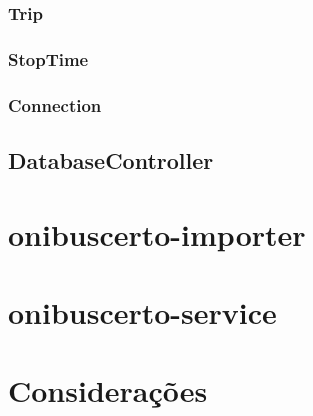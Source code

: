 \subsubsection{Trip}

\subsubsection{StopTime}

\subsubsection{Connection}


\subsection{DatabaseController}


\section{onibuscerto-importer}

\section{onibuscerto-service}

\section{Considerações}